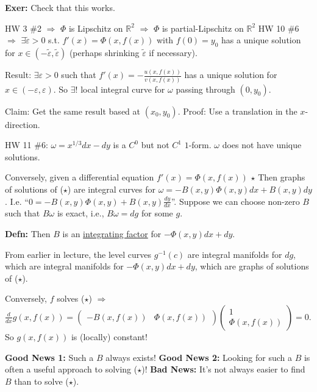\documentclass[10pt,letterpaper]{article}
\newcommand{\n}{\hfill\break}
\newcommand{\defn}[1]{\par\noindent\settowidth{\hangindent}{\textbf{Defn: }}\textbf{Defn: }#1\n}
\newcommand{\exer}[1]{\par\noindent\settowidth{\hangindent}{\textbf{Exer: }}\textbf{Exer: }#1\n}
\newcommand{\reals}{\mathbb{R}}
\newcommand{\R}{\reals}
\newcommand{\inv}{^{-1}}
\renewcommand{\epsilon}{\varepsilon}
\newcommand{\st}{s.t.}
\newcommand{\unique}{!}
\newcommand{\paren}[1]{\left(#1\right)}
\begin{document}
\exer{Check that this works.}

\par{} HW 3 \#2 $\Rightarrow$ $\Phi$ is Lipschitz on $\R^{2}$ $\Rightarrow$ $\Phi$ is partial-Lipschitz on $\R^{2}$\n
395 HW 10 \#6 $\Rightarrow$ $\exists\tilde{\epsilon}>0$ \st{} $f'(x)=\Phi(x,f(x))$ with $f(0)=y_{0}$ has a unique solution for $x\in(-\tilde{\epsilon},\tilde{\epsilon})$ (perhaps shrinking $\tilde{\epsilon}$ if necessary).\n

\par\noindent Result: $\exists\epsilon>0$ such that $f'(x)=-\frac{u(x,f(x))}{v(x,f(x))}$ has a unique solution for $x\in(-\epsilon,\epsilon)$. So $\exists\unique$ local integral curve for $\omega$ passing through $(0,y_{0})$.\n

\par\noindent Claim: Get the same result based at $(x_{0},y_{0})$.\n
Proof: Use a translation in the $x$-direction.\n

\par{} HW 11 \#6: $\omega=x^{1/3}dx-dy$ is a $C^{0}$ but not $C^{1}$ $1$-form. $\omega$ does not have unique solutions.\n

\par\noindent Conversely, given a differential equation $f'(x)=\Phi(x,f(x))$ $\star$\n
Then graphs of solutions of ($\star$) are integral curves for $\omega=-B(x,y)\Phi(x,y)dx+B(x,y)dy$.\n
I.e. ``$0=-B(x,y)\Phi(x,y)+B(x,y)\frac{dy}{dx}$''.\n
Suppose we can choose non-zero $B$ such that $B\omega$ is exact, i.e., $B\omega=dg$ for some $g$.\n

\defn{Then $B$ is an \underline{integrating factor} for $-\Phi(x,y)dx+dy$.}

\par\noindent From earlier in lecture, the level curves $g\inv(c)$ are integral manifolds for $dg$, which are integral manifolds for $-\Phi(x,y)dx+dy$, which are graphs of solutions of ($\star$).\n

\par\noindent Conversely, $f$ solves ($\star$) $\Rightarrow$ $\frac{d}{dx}g(x,f(x))=\paren{\begin{array}{cc}-B(x,f(x)) & \Phi(x,f(x))\end{array}}\paren{\begin{array}{c}1\\ \Phi(x,f(x))\end{array}}=0$.\n
So $g(x,f(x))$ is (locally) constant!\n

\par\noindent \textbf{Good News 1:} Such a $B$ always exists!\n
\textbf{Good News 2:} Looking for such a $B$ is often a useful approach to solving ($\star$)!\n
\textbf{Bad News:} It's not always easier to find $B$ than to solve ($\star$).\n
\end{document}
